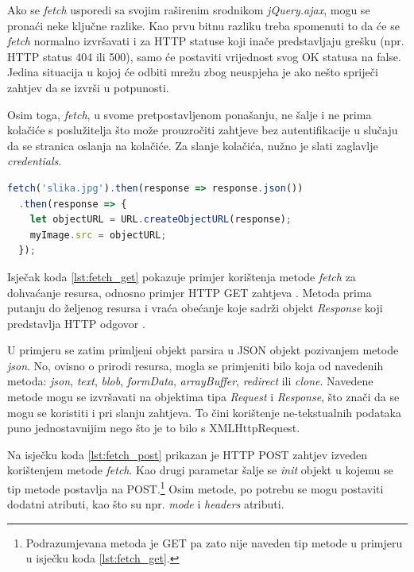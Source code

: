 \documentclass[times, utf8, zavrsni, numeric]{fer}
\newcommand{\razmakp}{\vspace{18pt}}
\newcommand{\razmaks}{\vspace{10pt}}
\begin{document}
\razmakp

Ako se \emph{fetch} usporedi sa svojim raširenim srodnikom \emph{jQuery.ajax}, mogu se pronaći neke ključne razlike. 
Kao prvu bitnu razliku treba spomenuti to da će se \emph{fetch} normalno izvršavati i za HTTP statuse koji inače predstavljaju grešku (npr. HTTP status 404 ili 500), samo će postaviti vrijednost svog OK statusa na false.
Jedina situacija u kojoj će odbiti mrežu zbog neuspjeha je ako nešto spriječi zahtjev da se izvrši u potpunosti.

Osim toga, \emph{fetch}, u svome pretpostavljenom ponašanju, ne šalje i ne prima kolačiće  s poslužitelja što može prouzročiti zahtjeve bez autentifikacije u slučaju da se stranica oslanja na kolačiće.
Za slanje kolačića, nužno je slati zaglavlje \emph{credentials}.

\newpage

\razmakp
\begin{lstlisting}[language=JavaScript, caption={Primjer dohvata resursa s Fetch API}, label={lst:fetch_get}]
fetch('slika.jpg').then(response => response.json())
  .then(response => {
    let objectURL = URL.createObjectURL(response);
    myImage.src = objectURL;
  });
\end{lstlisting}
\razmaks

Isječak koda \ref{lst:fetch_get} pokazuje primjer korištenja metode \emph{fetch} za dohvaćanje resursa, odnosno primjer HTTP GET zahtjeva .
Metoda prima putanju do željenog resursa i vraća obećanje koje sadrži objekt \emph{Response} koji predstavlja HTTP odgovor .

U primjeru se zatim primljeni objekt parsira u JSON objekt pozivanjem metode \emph{json}.
No, ovisno o prirodi resursa, mogla se primjeniti bilo koja od navedenih metoda: \emph{json}, \emph{text}, \emph{blob}, \emph{formData}, \emph{arrayBuffer}, \emph{redirect} ili \emph{clone}.\citep{fetch}
Navedene metode mogu se izvršavati na objektima tipa \emph{Request} i \emph{Response}, što znači da se mogu se koristiti i pri slanju zahtjeva.
To čini korištenje ne-tekstualnih podataka puno jednostavnijim nego što je to bilo s XMLHttpRequest.

\razmakp

Na isječku koda \ref{lst:fetch_post} prikazan je HTTP POST zahtjev  izveden korištenjem metode \emph{fetch}.
Kao drugi parametar šalje se \emph{init} objekt u kojemu se tip metode postavlja na POST.\footnote{Podrazumjevana metoda je GET pa zato nije naveden tip metode u primjeru u isječku koda \ref{lst:fetch_get}.}
Osim metode, po potrebu se mogu postaviti dodatni atributi, kao što su npr. \emph{mode} i \emph{headers} atributi.
\end{document}
